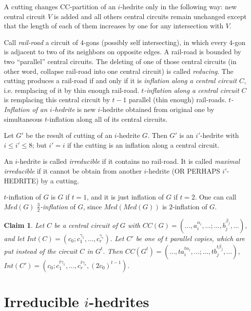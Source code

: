 \documentclass[12pt]{article}
\newtheorem{claim}{Claim}
\begin{document}
A cutting changes CC-partition of an $i$-hedrite only in the following 
way: new central circuit $V$ is added and all others central circuits 
remain unchanged except that the length of each of them increases by one 
for any intersection with $V$. 


Call {\em rail-road} a circuit of $4$-gons (possibly self intersecting), 
in which every $4$-gon is adjacent to two of its neighbors on opposite
edges. A rail-road is bounded by two ``parallel'' central circuits.
The deleting of  one of those central circuits (in other word, collapse 
rail-road into one central circuit) is called {\em reducing}.
The cutting produces a rail-road if and only if it is {\em inflation 
along a central circuit $C$}, i.e. remplacing of it by thin enough 
rail-road. {\em $t$-inflation along a central circuit $C$} is remplacing
this central circuit by $t-1$ parallel (thin enough) rail-roads.
{\em $t$-Inflation of an $i$-hedrite} is new $i$-hedrite
obtained from original one by simultaneous $t$-inflation along all
of its central circuits. 



Let $G'$ be the result of cutting of an $i$-hedrite $G$. Then $G'$ is an 
$i'$-hedrite with $i\leq i'\leq 8$; but $i'=i$ if the cutting is an 
inflation along a central circuit.


An $i$-hedrite is called {\em irreducible} if it contains no 
rail-road. It is called {\em maximal irreducible} if it cannot be
obtain from another $i$-hedrite (OR PERHAPS $i'$-HEDRITE) by a cutting.

$t$-inflation of $G$ is $G$ if $t=1$, and it is just inflation of $G$ 
if $t=2$. One can call $Med(G)$ {\em $\frac{3}{2}$-inflation} of $G$, 
since $Med(Med(G))$ is $2$-inflation of $G$.

\begin{claim}

Let $C$ be a central circuit of $G$ with $CC(G)=(...,a_i^{\alpha_i},...;...,b_j^{\beta_j},...)$,  and let 
$Int(C)=(c_0;c_1^{\gamma_1},...,c_r^{\gamma_r})$. Let $C'$ be one of 
$t$ parallel copies, which are put instead of the circuit $C$ in $G^t$.
Then $CC(G^t)=(...,ta_i^{t\alpha_i},...;...,tb_j^{t\beta_j},...)$,
$Int(C')=(c_0;c_1^{t\gamma_1},...,c_r^{t\gamma_r}, (2c_0)^{t-1})$.
\end{claim}



\section{Irreducible $i$-hedrites}
\end{document}
